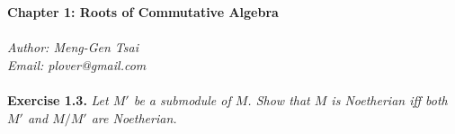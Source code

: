 \documentclass{article}
\begin{document}
\textbf{\Large Chapter 1: Roots of Commutative Algebra} \\\\



\emph{Author: Meng-Gen Tsai} \\
\emph{Email: plover@gmail.com} \\\\







\textbf{Exercise 1.3.}
\emph{Let $M'$ be a submodule of $M$.
Show that $M$ is Noetherian iff both $M'$ and $M/M'$ are Noetherian.} \\
\end{document}
